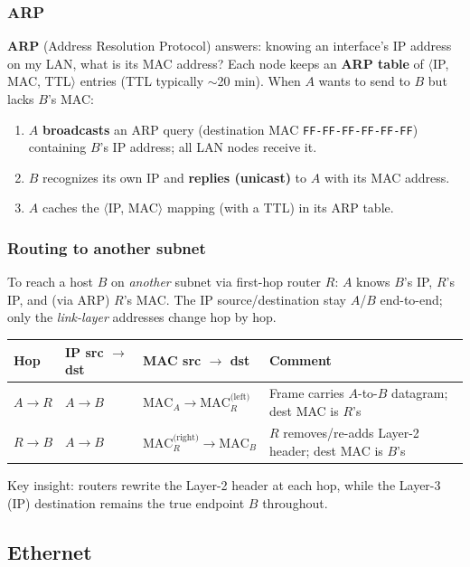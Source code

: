 \documentclass[hidelinks]{article}
\begin{document}
\subsubsection{ARP}
\textbf{ARP} (Address Resolution Protocol) answers: knowing an interface's IP
address on my LAN, what is its MAC address? Each node keeps an \textbf{ARP
table} of $\langle$IP, MAC, TTL$\rangle$ entries (TTL typically $\sim$20 min).
When $A$ wants to send to $B$ but lacks $B$'s MAC:
\begin{enumerate}
    \item $A$ \textbf{broadcasts} an ARP query (destination MAC
    \texttt{FF-FF-FF-FF-FF-FF}) containing $B$'s IP address; all LAN nodes
    receive it.
    \item $B$ recognizes its own IP and \textbf{replies (unicast)} to $A$ with
    its MAC address.
    \item $A$ caches the $\langle$IP, MAC$\rangle$ mapping (with a TTL) in its
    ARP table.
\end{enumerate}

\subsubsection{Routing to another subnet}
To reach a host $B$ on \emph{another} subnet via first-hop router $R$: $A$ knows
$B$'s IP, $R$'s IP, and (via ARP) $R$'s MAC. The IP source/destination stay
$A$/$B$ end-to-end; only the \emph{link-layer} addresses change hop by hop.

\renewcommand{\arraystretch}{1.3}
\noindent\begin{tabularx}{\textwidth}{|l|l|l|X|}
\hline
\textbf{Hop} & \textbf{IP src $\to$ dst} & \textbf{MAC src $\to$ dst} & \textbf{Comment} \\
\hline
$A \to R$ & $A \to B$ & $\text{MAC}_A \to \text{MAC}_R^{\text{(left)}}$ & Frame carries $A$-to-$B$ datagram; dest MAC is $R$'s \\
\hline
$R \to B$ & $A \to B$ & $\text{MAC}_R^{\text{(right)}} \to \text{MAC}_B$ & $R$ removes/re-adds Layer-2 header; dest MAC is $B$'s \\
\hline
\end{tabularx}

\medskip
\noindent Key insight: routers rewrite the Layer-2 header at each hop, while the
Layer-3 (IP) destination remains the true endpoint $B$ throughout.

\subsection{Ethernet}
\end{document}

